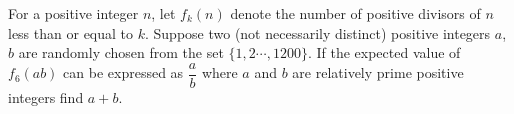 For a positive integer $n$, let $f_k(n)$ denote the number of positive divisors of $n$ less than or equal to $k$. Suppose two (not necessarily distinct) positive integers $a$, $b$ are randomly chosen from the set $\{1,2\cdots,1200\}$. If the expected value of $f_6(ab)$ can be expressed as $\dfrac{a}{b}$ where $a$ and $b$ are relatively prime positive integers find $a+b$.
